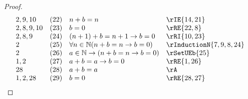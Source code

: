 \documentclass{book}
\theoremstyle{plain}
\theoremstyle{remark}
\theoremstyle{definition}
\begin{document}
\begin{proof}
\[\begin{array}{llll}
            2,9,10  &  (22) & n+b=n & \rIE{14,21} \\
            2,8,9,10&  (23) & b=0 & \rRE{22,8} \\
            2,8,9   &  (24) & (n+1)+b=n+1\rightarrow b=0 & \rRI{10,23} \\
            2       &  (25) & \forall n\in\mathbb{N}(n+b=n\rightarrow b=0) & \rInductionN{7,9,8,24} \\
            2       &  (26) & a\in\mathbb{N}\rightarrow (n+b=n\rightarrow b=0) & \rSetUEb{25} \\
            1,2     &  (27) & a+b=a\rightarrow b=0 & \rRE{1,26} \\
            28      &  (28) & a+b=a & \rA \\
            1,2,28  &  (29) & b=0 & \rRE{28,27} \\
	\end{array}
	\]
\end{proof}
\end{document}
